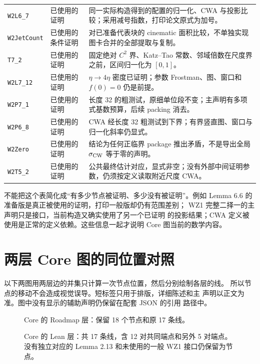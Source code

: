 \documentclass[UTF8,11pt,a4paper,fontset=none]{ctexart}
\DeclareRobustCommand{\id}[1]{\nolinkurl{#1}}
\begin{document}
\begin{longtable}{@{}>{\raggedright\arraybackslash}p{26mm}>{\raggedright\arraybackslash}p{27mm}>{\raggedright\arraybackslash}p{96mm}@{}}
\id{W2L6_7} & 已使用的证明 & 同一实际构造得到的配置的归一化、CWA 与投影比较；采用减号指数，打印论文原式为加号。\\
\id{W2JetCount} & 已使用的条件证明 & 对已准备代表块的 cinematic 面积比较，不单独实现图卡合并的全部提取与复制。\\
\id{T7_2} & 已使用的证明 & 固定绝对 $C^2$ 界、Katz--Tao 常数、邻域倍数在尺度界之前，区间归一化为 $[0,1]$。\\
\id{W2L7_12} & 已使用的证明 & $\eta\to4\eta$ 密度已证明；参数 Frostman、图、窗口和 $f(0)=0$ 仍是前提。\\
\id{W2P7_1} & 已使用的证明 & 长度 32 的粗测试，原细单位段不变；主声明有多项式基数预算，后续 packing 消去。\\
\id{W2P6_8} & 已使用的证明 & CWA 经长度 32 粗测试到下界；有界竖直图、窗口与归一化斜率仍显式。\\
\id{W2Zero} & 已使用的证明 & 结论为任何正临界 package 推出矛盾，不是导出全局 $\sigma_{\rm CW}$ 等于零的声明。\\
\id{W2T5_2} & 已使用的证明 & 公共最终估计对应，显式非空；没有外部中间证明参数，仍须按定义读取附近尺度 CWA。\\
\bottomrule
\end{longtable}

不能把这个表简化成“有多少节点被证明、多少没有被证明”。例如
Lemma 6.6 的准备版是真正被使用的证明，打印一般版却仍有范围差别；
WZ1 完整二择一的主声明只是接口，当前构造又确实使用了另一个已证明
的投影结果；CWA 定义被使用是正常的定义依赖。这些信息一起才说明
Core 图当前的数学内容。

\section{两层 Core 图的同位置对照}

以下两图用两层边的并集只计算一次节点位置，然后分别绘制各层的线。
所以节点的移动不会造成视觉误导。短标签只用于排版，详细陈述和主
声明以正文为准。图中没有显示的辅助声明仍保留在配套 JSON 的引用
路径中。


\begin{figure}[p]
 \centering
 \resizebox{.98\textwidth}{!}{\CoreRoadmapFigure}
 \caption{Core 的 Roadmap 层：保留 18 个节点和原 17 条线。}
\end{figure}
\begin{figure}[p]
 \centering
 \resizebox{.98\textwidth}{!}{\CoreLeanFigure}
 \caption{Core 的 Lean 层：共 17 条线，含 12 对共同端点和另外 5 对端点。
 没有独立对应的 Lemma 2.13 和未使用的一般 WZ1 接口仍保留为节点。}
\end{figure}
\clearpage
\end{document}
